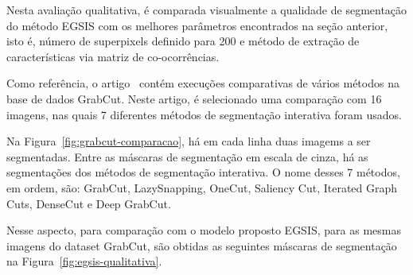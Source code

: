 Nesta avaliação qualitativa, é comparada visualmente a qualidade
de segmentação do método \gls{EGSIS} com os melhores parâmetros
encontrados na seção anterior, isto é, número de superpixels definido
para 200 e método de extração de características via matriz de
co-ocorrências.

Como referência, o artigo~\cite{wang2023review} contém execuções
comparativas de vários métodos na base de dados GrabCut. Neste artigo,
é selecionado uma comparação com 16 imagens, nas quais 7 diferentes
métodos de segmentação interativa foram usados.

\begin{figure}[h!]
        \captionsetup{width=16cm}
		\centering
\end{figure}
\FloatBarrier{}

Na Figura~\ref{fig:grabcut-comparacao}, há em cada linha duas
imagems a ser segmentadas. Entre as máscaras de segmentação em escala
de cinza, há as segmentações dos métodos de segmentação
interativa. O nome desses 7 métodos, em ordem, são: GrabCut,
LazySnapping, OneCut, Saliency Cut, Iterated Graph Cuts, DenseCut e
Deep GrabCut.

Nesse aspecto, para comparação com o modelo proposto \gls{EGSIS}, para
as mesmas imagens do dataset GrabCut, são obtidas as seguintes máscaras
de segmentação na Figura~\ref{fig:egsis-qualitativa}.

